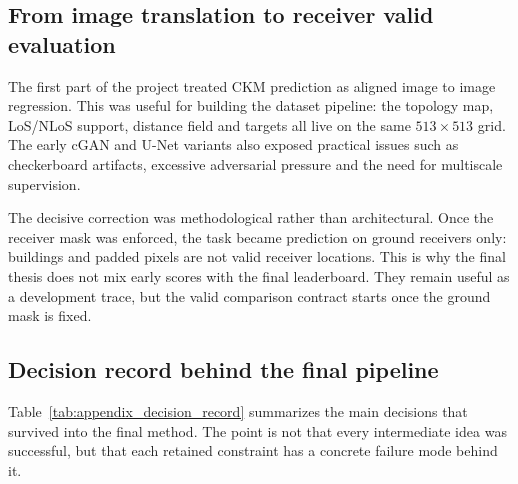 \subsection{From image translation to receiver valid evaluation}

The first part of the project treated CKM prediction as aligned
image to image regression. This was useful for building the dataset pipeline:
the topology map, LoS/NLoS support, distance field and targets all live on the
same \(513\times513\) grid. The early cGAN and U-Net variants also exposed
practical issues such as checkerboard artifacts, excessive adversarial pressure
and the need for multiscale supervision.

The decisive correction was methodological rather than architectural. Once the
receiver mask was enforced, the task became prediction on ground receivers
only: buildings and padded pixels are not valid receiver locations. This is why
the final thesis does not mix early scores with the final leaderboard. They
remain useful as a development trace, but the valid comparison contract starts
once the ground mask is fixed.

\subsection{Decision record behind the final pipeline}

Table~\ref{tab:appendix_decision_record} summarizes the main decisions that
survived into the final method. The point is not that every intermediate idea
was successful, but that each retained constraint has a concrete failure mode
behind it.

